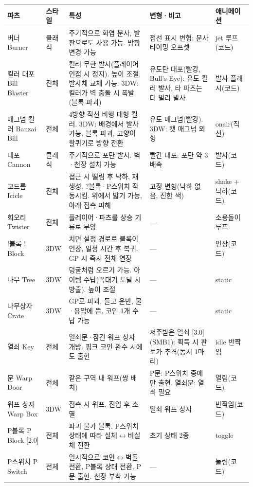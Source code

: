 \documentclass[10pt,a4paper]{article}
\begin{document}
\begin{longtable}{L{2.9cm} L{1.4cm} L{6.2cm} L{2.7cm} L{1.8cm}}
\toprule
\textbf{파츠} & \textbf{스타일} & \textbf{특성} & \textbf{변형·비고} & \textbf{애니메이션} \\
\midrule
\endhead
버너 Burner & 클래식 & 주기적으로 화염 분사, 발판으로도 사용 가능. 방향 변경 가능 & 점선 표시 변형: 분사 타이밍 오프셋 & jet 루프(코드) \\
킬러 대포 Bill Blaster & 전체 & 킬러 무한 발사(플레이어 인접 시 정지). 높이 조절, 발사체 교체 가능. 3DW: 킬러가 벽 충돌 시 폭발(블록 파괴) & 유도탄 대포(빨강, Bull's-Eye): 유도 킬러 발사, 타 파츠는 더 멀리 발사 & 발사 플래시(코드) \\
매그넘 킬러 Banzai Bill & 전체 & 4방향 직선 비행 대형 킬러. 3DW: 배경에서 발사 가능, 블록 파괴, 고양이 할퀴기로 방향 전환 & 유도 매그넘(빨강). 3DW: 캣 매그넘 외형 & onair(직선) \\
대포 Cannon & 클래식 & 주기적으로 포탄 발사. 벽·천장 설치 가능 & 빨간 대포: 포탄 약 3배속 & 발사(코드) \\
고드름 Icicle & 전체 & 접근 시 떨림 후 낙하, 재생성. ?블록·P스위치 작동시킴. 위에서 밟기 가능, 아래 접촉 피해 & 고정 변형(낙하 없음, 진한 색) & shake + 낙하(코드) \\
회오리 Twister & 전체 & 플레이어·파츠를 상승 기류로 부양 & — & 소용돌이 루프 \\
!블록 ! Block & 3DW & 치면 설정 경로로 블록이 연장, 일정 시간 후 복귀. GP 시 즉시 전체 연장 & — & 연장(코드) \\
나무 Tree & 3DW & 덩굴처럼 오르기 가능. 아이템 수납(꼭대기 도달 시 방출). 높이 조절 & — & static \\
나무상자 Crate & 3DW & GP로 파괴, 들고 운반, 물·용암에 뜸. 코인 1개 수납 가능 & — & static \\
열쇠 Key & 전체 & 열쇠문·잠긴 워프 상자 개방. 핑크 코인 완수 시에도 출현 & 저주받은 열쇠 [3.0](SMB1): 획득 시 판토가 추격(동시 1마리) & idle 반짝임 \\
문 Warp Door & 전체 & 같은 구역 내 워프(쌍 배치) & P문: P스위치 중에만 출현. 열쇠문: 열쇠 필요 & 열림(코드) \\
워프 상자 Warp Box & 3DW & 접촉 시 워프, 진입 후 소멸 & 열쇠 워프 상자 & 반짝임(코드) \\
P블록 P Block [2.0] & 전체 & 파괴 불가 블록. P스위치 상태에 따라 실체$\leftrightarrow$비실체 전환 & 초기 상태 2종 & toggle \\
P스위치 P Switch & 전체 & 일시적으로 코인$\leftrightarrow$벽돌 전환, P블록 상태 전환, P문 출현. 천장 부착 가능 & — & 눌림(코드) \\

\end{longtable}
\end{document}
